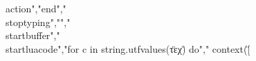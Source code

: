 action","end","\\stoptyping","","\\startbuffer","\\startluacode","for c in string.utfvalues(\"τεχ\") do","    context(\"[%